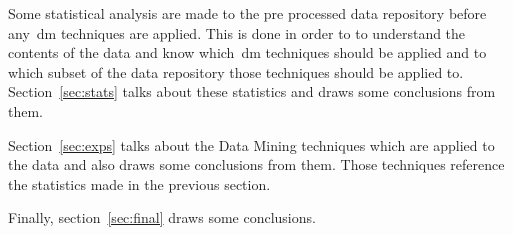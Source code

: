 Some statistical analysis are made to the pre processed data repository before
any~\gls{dm} techniques are applied. This is done in order to to understand the
contents of the data and know which~\gls{dm} techniques should be applied and
to which subset of the data repository those techniques should be applied to.
Section~\ref{sec:stats} talks about these statistics and draws some conclusions
from them.

Section~\ref{sec:exps} talks about the Data Mining techniques which are applied
to the data and also draws some conclusions from them. Those techniques
reference the statistics made in the previous section.

Finally, section~\ref{sec:final} draws some conclusions.
